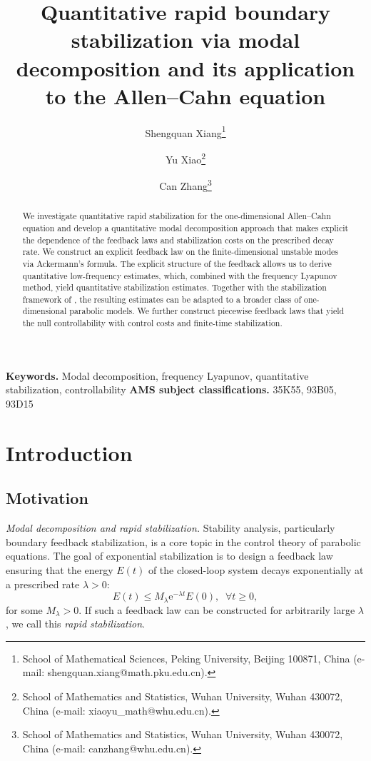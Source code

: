 \documentclass[a4paper]{article}
\title{Quantitative rapid boundary stabilization via modal decomposition and its application to the Allen--Cahn equation}
\author{Shengquan Xiang{\footnote{School of Mathematical Sciences, Peking University, Beijing 100871, China (e-mail: shengquan.xiang@math.pku.edu.cn).}}\and Yu Xiao{\footnote{School of Mathematics and Statistics, Wuhan University, Wuhan 430072, China (e-mail: xiaoyu\_math@whu.edu.cn).}}\and Can Zhang{\footnote{School of Mathematics and Statistics, Wuhan University, Wuhan 430072, China (e-mail: canzhang@whu.edu.cn).}}}
\date{}
\numberwithin{equation}{section}
\begin{document}
\maketitle

\begin{abstract}
We investigate quantitative rapid stabilization for the one-dimensional Allen--Cahn equation and develop a quantitative modal decomposition approach that makes explicit the dependence of the feedback laws and stabilization costs on the prescribed decay rate. We construct an explicit feedback law on the finite-dimensional unstable modes via Ackermann's formula. The explicit structure of the feedback allows us to derive quantitative low-frequency estimates, which, combined with the frequency Lyapunov method, yield quantitative stabilization estimates. Together with the stabilization framework of \cite{XZ}, the resulting estimates can be adapted to a broader class of one-dimensional parabolic models. We further construct piecewise feedback laws that yield the null controllability with control costs and finite-time stabilization.
\end{abstract}

{\bf Keywords.} Modal decomposition, frequency Lyapunov, quantitative stabilization, controllability
\vskip 5pt
{\bf AMS subject classifications.} 35K55, 93B05, 93D15


\section{Introduction}
\subsection{Motivation}
\noindent \textit{Modal decomposition and rapid stabilization.} Stability analysis, particularly boundary feedback stabilization, is a core topic in the control theory of parabolic equations. The goal of exponential stabilization is to design
a feedback law ensuring that the energy $E(t)$ of the closed-loop system decays exponentially at a prescribed
rate $\lambda>0$: 
\begin{equation*}
E(t) \leq M_{\lambda}\mathrm{e}^{-\lambda t}E(0),\;\; \forall t\ge 0,
\end{equation*} 
for some $M_\lambda>0$. If such a feedback law can be constructed for arbitrarily large $\lambda$, we call this \textit{rapid stabilization}.
\vspace{1mm}
\end{document}
